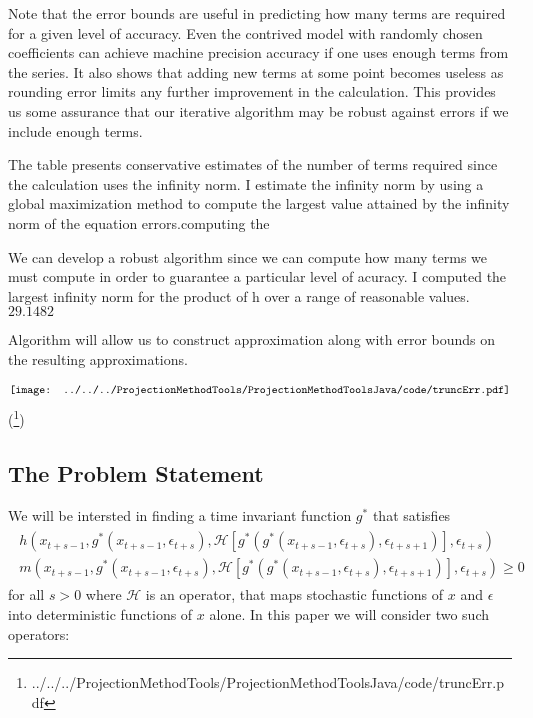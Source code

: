 \documentclass[12pt]{article}
\begin{document}
Note that the error bounds are useful in predicting how many terms are required for a given level of accuracy. Even the contrived model with randomly chosen
coefficients can achieve machine precision accuracy if one uses enough
terms from the series.  It also shows that adding new terms at some point becomes useless as rounding error limits any further improvement in the calculation.
This provides us some assurance that our iterative algorithm may be robust 
against errors if we include enough terms.

The table presents conservative estimates of the number of terms required
since the calculation uses the infinity norm.  I estimate the infinity
norm by using a global maximization method to compute the largest value
attained by the infinity norm of the equation errors.computing the

We can develop a robust algorithm since we can compute how many terms
we must compute in order to guarantee a particular level of acuracy.
I computed the largest infinity norm for the product of h over a range of
reasonable values.$29.1482$

Algorithm will allow us to construct approximation along with error bounds on the resulting approximations.


\begin{gather*}
\vcenter{\hbox{\texttt{[image: ../../../ProjectionMethodTools/ProjectionMethodToolsJava/code/truncErr.pdf]}}}
\end{gather*}(\footnote{{../../../ProjectionMethodTools/ProjectionMethodToolsJava/code/truncErr.pdf}})
  \subsection{The Problem Statement}


We will be intersted in
finding a time invariant function $g^\ast$ that satisfies
\begin{gather}
  \begin{split}
h(x_{t+s-1},g^\ast(x_{t+s-1},\epsilon_{t+s}),\mathcal{H}[g^\ast(g^\ast(x_{t+s-1},\epsilon_{t+s}),\epsilon_{t+s+1})],\epsilon_{t+s}) \\
m(x_{t+s-1},g^\ast(x_{t+s-1},\epsilon_{t+s}),\mathcal{H}[g^\ast(g^\ast(x_{t+s-1},\epsilon_{t+s}),\epsilon_{t+s+1})],\epsilon_{t+s}) \ge 0  \label{theProblem}
  \end{split}
 \end{gather}
 for all $s>0$ where $\mathcal{H}$ is an operator, 
  that maps stochastic functions of $x$ and $\epsilon$ into deterministic 
functions of $x$ alone.  In this paper we will consider two such operators:
\end{document}
